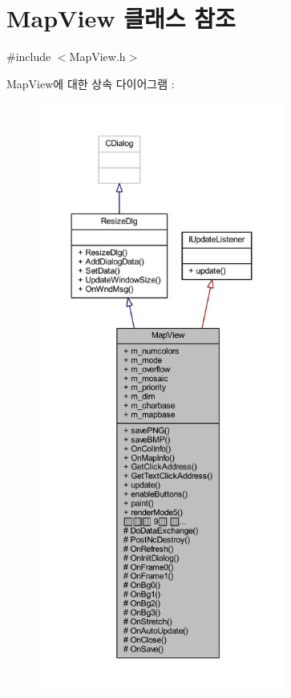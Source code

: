 \hypertarget{class_map_view}{}\section{Map\+View 클래스 참조}
\label{class_map_view}


{\ttfamily \#include $<$Map\+View.\+h$>$}



Map\+View에 대한 상속 다이어그램 \+: \nopagebreak
\begin{figure}[H]
\begin{center}
\leavevmode
\includegraphics[height=550pt]{class_map_view__inherit__graph}
\end{center}
\end{figure}


